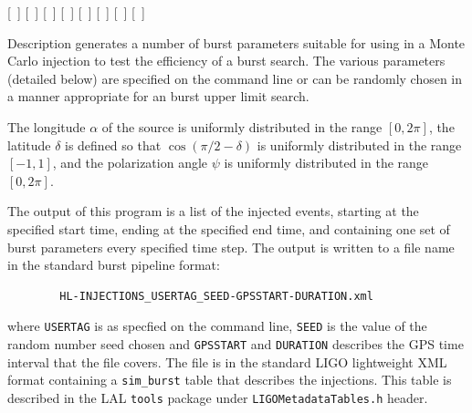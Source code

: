 \begin{entry}
 \newline \hspace*{0.5in}
[~] \newline \hspace*{0.5in}
[~] \newline \hspace*{0.5in}
[~] \newline \hspace*{0.5in}
[~] \newline \hspace*{0.5in}
[~] \newline \hspace*{0.5in}
[~] \newline \hspace*{0.5in}
[~] \newline \hspace*{0.5in}
[~]

\item[Description] 
 generates a number of burst  parameters suitable  for
using in a Monte Carlo injection to test the efficiency of a burst search.
The  various parameters (detailed  below)  are specified on the command
line or can be randomly chosen in a manner appropriate for an burst upper
limit search.

The longitude $\alpha$ of the source is uniformly distributed in the range
$[0,2\pi]$, the latitude $\delta$ is defined so that $\cos(\pi/2 - \delta)$
is uniformly distributed in the range $[-1,1]$,  and the polarization angle
$\psi$  is uniformly distributed in the range $[0,2\pi]$.

The output of this program  is  a  list  of  the  injected events,
starting at  the specified start time, ending at the specified end time,
and containing one set  of burst parameters every specified time step.  The
output is written to a file name in the standard burst pipeline format:
\begin{center}
\begin{verbatim}
        HL-INJECTIONS_USERTAG_SEED-GPSSTART-DURATION.xml
\end{verbatim}
\end{center}
where \verb$USERTAG$ is  as specfied on the command line,
\verb$SEED$ is the  value  of  the random number seed chosen and
\verb$GPSSTART$ and \verb$DURATION$ describes the GPS time interval that
the file covers. The file is in the standard LIGO lightweight XML format
containing a \texttt{sim\_burst} table that describes the injections.  This
table is described in the LAL \texttt{tools} package under
\texttt{LIGOMetadataTables.h} header.  


\end{entry}
